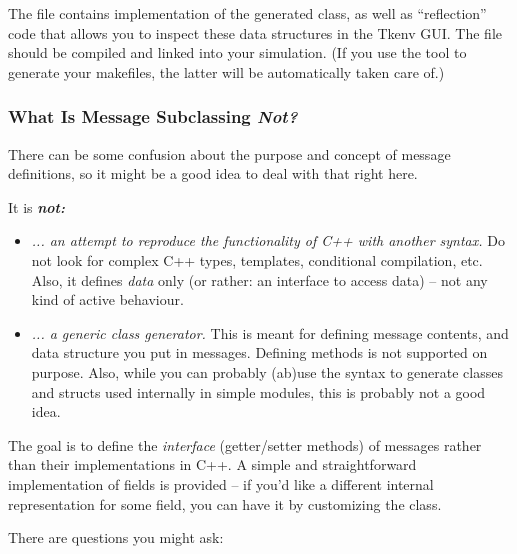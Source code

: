 The  file contains implementation of the generated 
class, as well as ``reflection'' code that allows you to inspect these data
structures in the Tkenv GUI. The  file should be compiled and
linked into your simulation. (If you use the  tool
to generate your makefiles, the latter will be automatically taken care of.)


\subsubsection{What Is Message Subclassing \textit{Not?}}

There can be some confusion about the purpose and
concept of message definitions, so it might be a good idea
to deal with that right here.

It is \textit{\textbf{not:}}

\begin{itemize}
  \item{\textit{... an attempt to reproduce the functionality of C++ with another
     syntax.} Do not look for complex C++ types, templates, conditional compilation, etc.
     Also, it defines \textit{data} only (or rather: an interface to access
     data) -- not any kind of active behaviour.}
  \item{\textit{... a generic class generator.} This is meant for defining message
     contents, and data structure you put in messages.
     Defining methods is not supported on purpose.
     Also, while you can probably (ab)use the syntax to
     generate classes and structs used internally in simple modules,
     this is probably not a good idea.}
\end{itemize}

The goal is to define the \textit{interface} (getter/setter methods) of messages
rather than their implementations in C++. A simple and straightforward
implementation of fields is provided -- if you'd like a different internal
representation for some field, you can have it by customizing the class.

There are questions you might ask:

